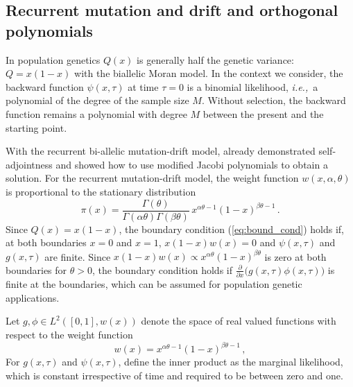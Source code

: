 \documentclass[preprint]{elsarticle}
\newcommand\ie{{\it i.e.,}}
\begin{document}
\subsection{Recurrent mutation and drift and orthogonal polynomials}

In population genetics $Q(x)$ is generally half the genetic variance: $Q=x(1-x)$ with the biallelic Moran model. In the context we consider, the backward function $\psi(x,\tau)$ at time $\tau=0$ is a binomial likelihood, \ie\ a polynomial of the degree of the sample size $M$. Without selection, the backward function remains a polynomial with degree $M$ between the present and the starting point. 

With the recurrent bi-allelic mutation-drift model, \citet{Song12} already demonstrated self-adjointness and showed how to use modified Jacobi polynomials to obtain a solution. For the recurrent mutation-drift model, the weight function $w(x,\alpha,\theta)$ is proportional to the stationary distribution 
\begin{equation}
    \pi(x)=\frac{\Gamma(\theta)}{\Gamma(\alpha\theta)\Gamma(\beta\theta)}\,x^{\alpha\theta-1}(1-x)^{\beta\theta-1}\,.
\end{equation}
Since $Q(x)=x(1-x)$, the boundary condition (\ref{eq:bound_cond}) holds if, at both boundaries $x=0$ and $x=1$, $x(1-x)w(x)=0$ and  $\psi(x,\tau)$ and $g(x,\tau)$ are finite. Since  $x(1-x)w(x)\propto x^{\alpha\theta}(1-x)^{\beta\theta}$ is zero at both boundaries for $\theta>0$, the boundary condition holds if $\frac{\partial}{\partial x}\big(g(x,\tau)\phi(x,\tau))$ is finite at the boundaries, which can be assumed for population genetic applications. 

Let $g,\phi \in L^2([0,1],w(x))$ denote the space of real valued functions with respect to the weight function
\begin{equation}
w(x)=x^{\alpha\theta-1}(1-x)^{\beta\theta-1}\,,
\end{equation}
For $g(x,\tau)$ and $\psi(x,\tau)$, define the inner product as the marginal likelihood, which is constant irrespective of time and required to be between zero and one.
\end{document}
